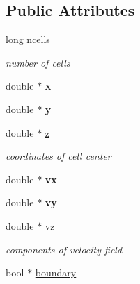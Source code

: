 \subsection*{Public Attributes}
\begin{DoxyCompactItemize}
\item 
\mbox{\label{classCELLS_a924c191a4fdd3ba7c1a5490ea33e5950}} 
long \mbox{\hyperlink{classCELLS_a924c191a4fdd3ba7c1a5490ea33e5950}{ncells}}
\begin{DoxyCompactList}\small\item\em number of cells \end{DoxyCompactList}\item 
\mbox{\label{classCELLS_a7665a428475d8019c3e39ecaaf9570be}} 
double $\ast$ {\bfseries x}
\item 
\mbox{\label{classCELLS_af462f8183ee6f74193f443f60eed3a3e}} 
double $\ast$ {\bfseries y}
\item 
\mbox{\label{classCELLS_a4d8ce80c899346b1dde01c98c357b9bd}} 
double $\ast$ \mbox{\hyperlink{classCELLS_a4d8ce80c899346b1dde01c98c357b9bd}{z}}
\begin{DoxyCompactList}\small\item\em coordinates of cell center \end{DoxyCompactList}\item 
\mbox{\label{classCELLS_aeb43f948e5db365e6b78d4d82c4d6ac9}} 
double $\ast$ {\bfseries vx}
\item 
\mbox{\label{classCELLS_a11fc8be4659f6cf373c192dff13934cd}} 
double $\ast$ {\bfseries vy}
\item 
\mbox{\label{classCELLS_a55946fdf0e5592623dd7ada5871194b5}} 
double $\ast$ \mbox{\hyperlink{classCELLS_a55946fdf0e5592623dd7ada5871194b5}{vz}}
\begin{DoxyCompactList}\small\item\em components of velocity field \end{DoxyCompactList}\item 
\mbox{\label{classCELLS_a8acd1bb829638c3b28ae7518a75e0726}} 
bool $\ast$ \mbox{\hyperlink{classCELLS_a8acd1bb829638c3b28ae7518a75e0726}{boundary}}

\end{DoxyCompactItemize}
